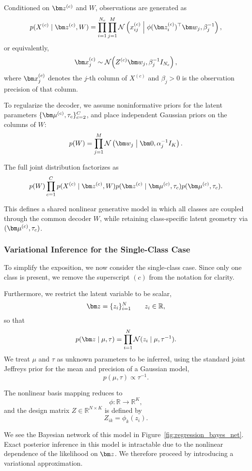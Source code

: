 Conditioned on $\vect{z}^{(c)}$ and $W$, observations are generated as
\[
    p(X^{(c)} \mid \vect{z}^{(c)}, W)
    =
    \prod_{i=1}^{N_c}\prod_{j=1}^M
    \Nor{x_{ij}^{(c)}}{\phi(\vect{z}_i^{(c)})^\top \vect{w}_j}{\beta_j^{-1}},
\]
or equivalently,
\[
    \vect{x}_j^{(c)}
    \sim
    \mathcal{N}\!\left(Z^{(c)} \vect{w}_j, \beta_j^{-1} I_{N_c} \right),
\]
where $\vect{x}_j^{(c)}$ denotes the $j$-th column of $X^{(c)}$
and $\beta_j > 0$ is the observation precision of that column.

To regularize the decoder,
we assume noninformative priors for the latent parameters
$\{\vect{\mu}^{(c)}, \tau_c\}_{c=2}^C$,
and place independent Gaussian priors on the columns of $W$:
\[
    p(W)
    =
    \prod_{j=1}^{M}
    \Nor{\vect{w}_j}{\vect{0}}{\alpha_j^{-1} I_K}.
\]

The full joint distribution factorizes as
\[
    p(W)
    \prod_{c=1}^C
    p(X^{(c)} \mid \vect{z}^{(c)}, W)
    p(\vect{z}^{(c)} \mid \vect{\mu}^{(c)}, \tau_c)
    p(\vect{\mu}^{(c)}, \tau_c).
\]

This defines a shared nonlinear generative model in which
all classes are coupled through the common decoder $W$,
while retaining class-specific latent geometry via
$(\vect{\mu}^{(c)}, \tau_c)$.

\subsubsection{Variational Inference for the Single-Class Case}

To simplify the exposition, we now consider the single-class case.
Since only one class is present, we remove the superscript $(c)$
from the notation for clarity.

Furthermore, we restrict the latent variable to be scalar,
\[
    \vect{z} = \{z_i\}_{i=1}^N
    \qquad
    z_i \in \mathbb{R},
\]
so that
\[
    p(\vect{z} \mid \mu, \tau)
    =
    \prod_{i=1}^N
    \mathcal{N}(z_i \mid \mu, \tau^{-1}).
\]
We treat $\mu$ and $\tau$ as unknown parameters to be inferred,
using the standard joint Jeffreys prior for the mean and precision of a Gaussian model,
\[p(\mu, \tau) \propto \tau^{-1}.\]

The nonlinear basis mapping reduces to
\[
    \phi : \mathbb{R} \to \mathbb{R}^K,
\]
and the design matrix $Z \in \mathbb{R}^{N \times K}$ is defined by
\[
    Z_{ik} = \phi_k(z_i).
\]

We see the Bayesian network of this model in Figure~\ref{fig:regression_bayes_net}.
Exact posterior inference in this model is intractable
due to the nonlinear dependence of the likelihood on $\vect{z}$.
We therefore proceed by introducing a variational approximation.

